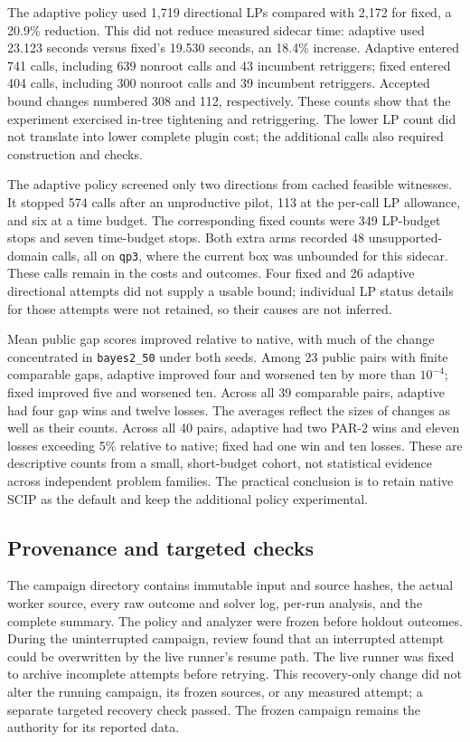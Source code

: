 The adaptive policy used 1,719 directional LPs compared with 2,172 for
fixed, a 20.9\% reduction. This did not reduce measured sidecar time:
adaptive used 23.123 seconds versus fixed's 19.530 seconds, an 18.4\%
increase. Adaptive entered 741 calls, including 639 nonroot calls and
43 incumbent retriggers; fixed entered 404 calls, including 300 nonroot
calls and 39 incumbent retriggers. Accepted bound changes numbered
308 and 112, respectively. These counts show that the experiment
exercised in-tree tightening and retriggering. The lower LP count did
not translate into lower complete plugin cost; the additional calls
also required construction and checks.

The adaptive policy screened only two directions from cached feasible
witnesses. It stopped 574 calls after an unproductive pilot, 113 at the
per-call LP allowance, and six at a time budget. The corresponding fixed
counts were 349 LP-budget stops and seven time-budget stops. Both extra
arms recorded 48 unsupported-domain calls, all on \texttt{qp3}, where
the current box was unbounded for this sidecar. These calls remain in
the costs and outcomes. Four fixed and 26 adaptive directional attempts
did not supply a usable bound; individual LP status details for those
attempts were not retained, so their causes are not inferred.

Mean public gap scores improved relative to native, with much of the
change concentrated in \texttt{bayes2\_50} under both seeds. Among 23
public pairs with finite comparable gaps, adaptive improved four and
worsened ten by more than $10^{-4}$; fixed improved five and worsened
ten. Across all 39 comparable pairs, adaptive had four gap wins and
twelve losses. The averages reflect the sizes of changes as well as
their counts. Across all 40 pairs, adaptive had two PAR-2 wins and eleven
losses exceeding 5\% relative to native; fixed had one win and ten
losses. These are descriptive counts from a small, short-budget cohort,
not statistical evidence across independent problem families. The
practical conclusion is to retain native SCIP as the default and keep
the additional policy experimental.

\subsection{Provenance and targeted checks}

The campaign directory
contains immutable input and source hashes, the actual worker source,
every raw outcome and solver log, per-run analysis, and the complete
summary. The policy and analyzer were frozen before holdout outcomes.
During the uninterrupted campaign, review found that an interrupted
attempt could be overwritten by the live runner's resume path. The live
runner was fixed to archive incomplete attempts before retrying. This
recovery-only change did not alter the running campaign, its frozen
sources, or any measured attempt; a separate targeted recovery check
passed. The frozen campaign remains the authority for its reported data.

